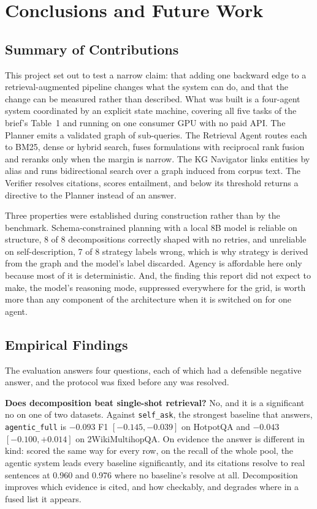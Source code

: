 \chapter{Conclusions and Future Work}
\label{ch:conclusions}

\section{Summary of Contributions}

This project set out to test a narrow claim: that adding one backward edge to
a retrieval-augmented pipeline changes what the system can do, and that the
change can be measured rather than described. What was built is a four-agent
system coordinated by an explicit state machine, covering all five tasks of
the brief's Table~1 and running on one consumer GPU with no paid API. The
Planner emits a validated graph of sub-queries. The Retrieval Agent routes each
to BM25, dense or hybrid search, fuses formulations with reciprocal rank
fusion~\cite{cormack2009reciprocal} and reranks only when the margin is
narrow. The KG Navigator links entities by alias and runs bidirectional search
over a graph induced from corpus text. The Verifier resolves citations, scores
entailment, and below its threshold returns a directive to the Planner instead
of an answer.

Three properties were established during construction rather than by the
benchmark. Schema-constrained planning with a local 8B model is reliable on
structure, 8 of 8 decompositions correctly shaped with no retries, and
unreliable on self-description, 7 of 8 strategy labels wrong, which is why
strategy is derived from the graph and the model's label discarded. Agency is
affordable here only because most of it is deterministic. And, the finding
this report did not expect to make, the model's reasoning mode, suppressed
everywhere for the grid, is worth more than any component of the architecture
when it is switched on for one agent.

\section{Empirical Findings}

The evaluation answers four questions, each of which had a defensible negative
answer, and the protocol was fixed before any was resolved.

\textbf{Does decomposition beat single-shot retrieval?} No, and it is a
significant no on one of two datasets. Against \texttt{self\_ask}, the
strongest baseline that answers, \texttt{agentic\_full} is $-0.093$ F1
$[-0.145, -0.039]$ on HotpotQA and $-0.043$ $[-0.100, +0.014]$ on
2WikiMultihopQA. On evidence the answer is different in kind: scored the same
way for every row, on the recall of the whole pool, the agentic system leads
every baseline significantly, and its citations resolve to real sentences at
0.960 and 0.976 where no baseline's resolve at all. Decomposition improves
which evidence is cited, and how checkably, and degrades where in a fused
list it appears.

